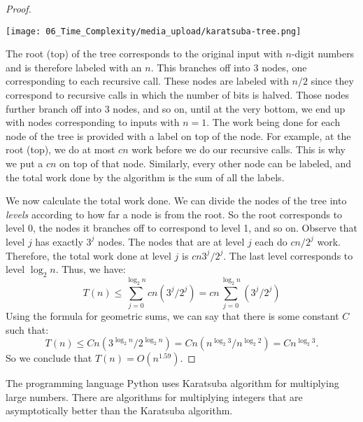 \begin{flex}
\begin{proof}
\begin{center}
\texttt{[image: 06\_Time\_Complexity/media\_upload/karatsuba-tree.png]}
\end{center}

The root (top) of the tree corresponds to the original input with $n$-digit numbers and is therefore labeled with an $n$. This branches off into 3 nodes, one corresponding to each recursive call. These nodes are labeled with $n/2$ since they correspond to recursive calls in which the number of bits is halved. Those nodes further branch off into 3 nodes, and so on, until at the very bottom, we end up with nodes corresponding to inputs with $n = 1$. The work being done for each node of the tree is provided with a label on top of the node. For example, at the root (top), we do at most $cn$ work before we do our recursive calls. This is why we put a $cn$ on top of that node. Similarly, every other node can be labeled, and the total work done by the algorithm is the sum of all the labels. 

We now calculate the total work done. We can divide the nodes of the tree into \emph{levels} according to how far a node is from the root. So the root corresponds to level 0, the nodes it branches off to correspond to level 1, and so on. Observe that level $j$ has exactly $3^j$ nodes. The nodes that are at level $j$ each do $cn/2^j$ work. Therefore, the total work done at level $j$ is $cn3^j/2^j$. The last level corresponds to level $\log_2 n$. Thus, we have:
\[
T(n) \leq \sum_{j = 0}^{\log_2 n} cn (3^j/2^j) = cn \sum_{j=0}^{\log_2 n} (3^j/2^j)
\]
Using the formula for geometric sums, we can say that there is some constant $C$ such that:
\[
T(n) \leq Cn (3^{\log_2 n} / 2^{\log_2 n}) = Cn (n^{\log_2 3} / n^{\log_2 2}) = C n^{\log_2 3}.
\]
So we conclude that $T(n) = O(n^{1.59})$.
\end{proof}
\end{flex}

\begin{remark}
The programming language Python uses Karatsuba algorithm for multiplying large numbers. There are algorithms for multiplying integers that are asymptotically better than the Karatsuba algorithm.
\end{remark}



